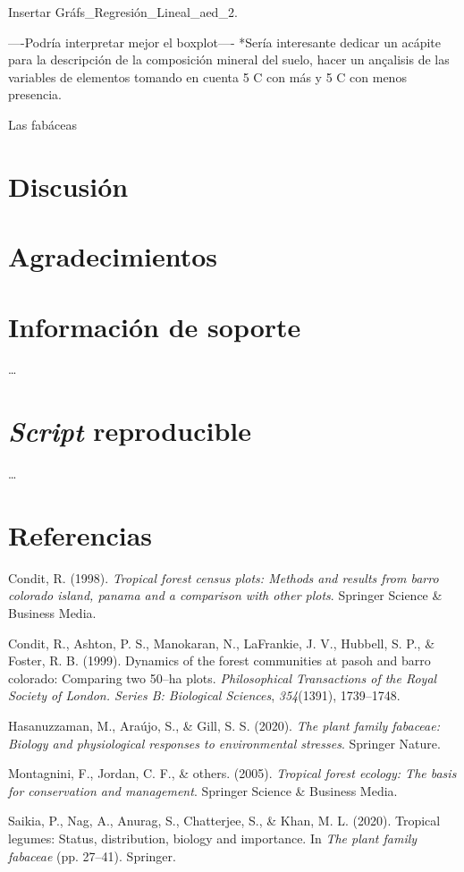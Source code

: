 \documentclass[11pt,]{article}
\begin{document}
Insertar Gráfs\_Regresión\_Lineal\_aed\_2.

----Podría interpretar mejor el boxplot---- *Sería interesante dedicar
un acápite para la descripción de la composición mineral del suelo,
hacer un ançalisis de las variables de elementos tomando en cuenta 5 C
con más y 5 C con menos presencia.

Las fabáceas

\section{Discusión}\label{discusiuxf3n}

\section{Agradecimientos}\label{agradecimientos}

\section{Información de soporte}\label{informaciuxf3n-de-soporte}

\ldots

\section{\texorpdfstring{\emph{Script}
reproducible}{Script reproducible}}\label{script-reproducible}

\ldots

\section*{Referencias}\label{referencias}

\hypertarget{refs}{}
\hypertarget{ref-condit1998tropical}{}
Condit, R. (1998). \emph{Tropical forest census plots: Methods and
results from barro colorado island, panama and a comparison with other
plots}. Springer Science \& Business Media.

\hypertarget{ref-condit1999dynamics}{}
Condit, R., Ashton, P. S., Manokaran, N., LaFrankie, J. V., Hubbell, S.
P., \& Foster, R. B. (1999). Dynamics of the forest communities at pasoh
and barro colorado: Comparing two 50--ha plots. \emph{Philosophical
Transactions of the Royal Society of London. Series B: Biological
Sciences}, \emph{354}(1391), 1739--1748.

\hypertarget{ref-hasanuzzaman2020plant}{}
Hasanuzzaman, M., Araújo, S., \& Gill, S. S. (2020). \emph{The plant
family fabaceae: Biology and physiological responses to environmental
stresses}. Springer Nature.

\hypertarget{ref-montagnini2005tropical}{}
Montagnini, F., Jordan, C. F., \& others. (2005). \emph{Tropical forest
ecology: The basis for conservation and management}. Springer Science \&
Business Media.

\hypertarget{ref-saikia2020tropical}{}
Saikia, P., Nag, A., Anurag, S., Chatterjee, S., \& Khan, M. L. (2020).
Tropical legumes: Status, distribution, biology and importance. In
\emph{The plant family fabaceae} (pp. 27--41). Springer.




\newpage
\singlespacing 
\end{document}
